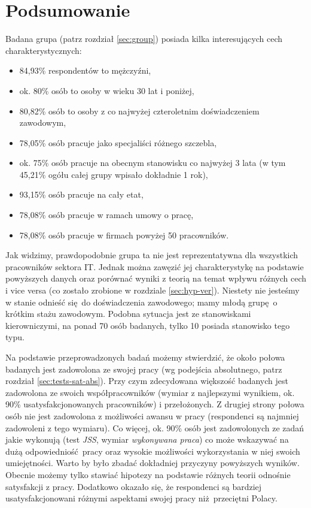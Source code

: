 \chapter{Podsumowanie}

Badana grupa (patrz rozdział \ref{sec:group}) posiada kilka interesujących cech charakterystycznych:
\begin{itemize}
  \item 84,93\% respondentów to mężczyźni,
  \item ok. 80\% osób to osoby w wieku 30 lat i poniżej,
  \item 80,82\% osób to osoby z co najwyżej czteroletnim doświadczeniem zawodowym,
  \item 78,05\% osób pracuje jako specjaliści różnego szczebla,
  \item ok. 75\% osób pracuje na obecnym stanowisku co najwyżej 3 lata (w tym 45,21\% ogółu całej grupy wpisało dokładnie 1 rok),
  \item 93,15\% osób pracuje na cały etat,
  \item 78,08\% osób pracuje w ramach umowy o pracę,
  \item 78,08\% osób pracuje w firmach powyżej 50 pracowników.
\end{itemize}
Jak widzimy, prawdopodobnie grupa ta nie jest reprezentatywna dla wszystkich pracowników sektora IT. Jednak można zawęzić jej charakterystykę na podstawie powyższych danych oraz porównać wyniki z teorią na temat wpływu różnych cech i vice versa (co zostało zrobione w rozdziale \ref{sec:hyp-ver}). Niestety nie jesteśmy w stanie odnieść się do doświadczenia zawodowego; mamy młodą grupę o krótkim stażu zawodowym. Podobna sytuacja jest ze stanowiskami kierowniczymi, na ponad 70 osób badanych, tylko 10 posiada stanowisko tego typu.

Na podstawie przeprowadzonych badań możemy stwierdzić, że około połowa badanych jest zadowolona ze swojej pracy (wg podejścia absolutnego, patrz rozdział \ref{sec:tests-sat-abs}). Przy czym zdecydowana większość badanych jest zadowolona ze swoich współpracowników (wymiar z najlepszymi wynikiem, ok. 90\% usatysfakcjonowanych pracowników) i przełożonych. Z drugiej strony połowa osób nie jest zadowolona z możliwości awansu w pracy (respondenci są
najmniej zadowoleni z tego wymiaru). Co więcej, ok. 90\% osób jest zadowolonych ze zadań jakie wykonują (test \emph{JSS}, wymiar \textit{wykonywana praca}) co może wskazywać na dużą odpowiedniość pracy oraz wysokie możliwości wykorzystania w niej swoich umiejętności. Warto by było zbadać dokładniej przyczyny powyższych wyników. Obecnie możemy tylko stawiać hipotezy na podstawie różnych teorii odnośnie satysfakcji z pracy.  Dodatkowo okazało się, że respondenci są bardziej usatysfakcjonowani różnymi aspektami swojej pracy niż przeciętni Polacy.

